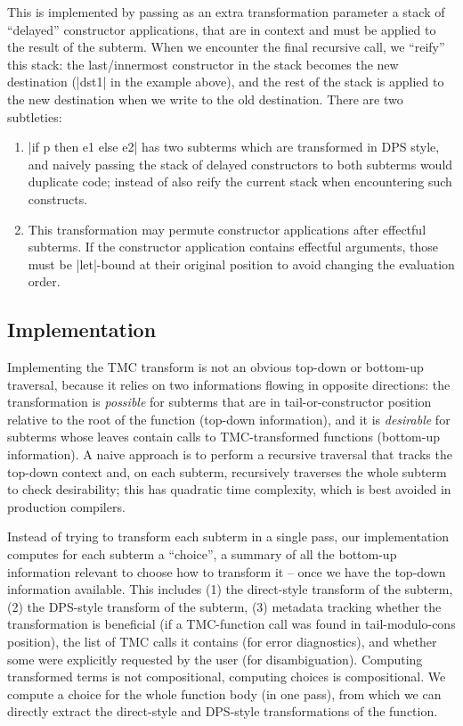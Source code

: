 This is implemented by passing as an extra transformation parameter a stack of ``delayed'' constructor applications, that are in context and must be applied to the result of the subterm. When we encounter the final recursive call, we ``reify'' this stack: the last/innermost constructor in the stack becomes the new destination (\ocaml|dst1| in the example above), and the rest of the stack is applied to the new destination when we write to the old destination. There are two subtleties:
\begin{enumerate}
\item \ocaml|if p then e1 else e2| has two subterms which are transformed in DPS style, and naively passing the stack of delayed constructors to both subterms would duplicate code; instead of also reify the current stack when encountering such constructs.
\item This transformation may permute constructor applications after effectful subterms. If the constructor application contains effectful arguments, those must be \ocaml|let|-bound at their original position to avoid changing the evaluation order.
\end{enumerate}

\subsection{Implementation} \label{subsec:implementation} Implementing the TMC transform is not an obvious top-down or bottom-up traversal, because it relies on two informations flowing in opposite directions: the transformation is \emph{possible} for subterms that are in tail-or-constructor position relative to the root of the function (top-down information), and it is \emph{desirable} for subterms whose leaves contain calls to TMC-transformed functions (bottom-up information). A naive approach is to perform a recursive traversal that tracks the top-down context and, on each subterm, recursively traverses the whole subterm to check desirability; this has quadratic time complexity, which is best avoided in production compilers.

Instead of trying to transform each subterm in a single pass, our implementation computes for each subterm a ``choice'', a summary of all the bottom-up information relevant to choose how to transform it -- once we have the top-down information available. This includes (1) the direct-style transform of the subterm, (2) the DPS-style transform of the subterm, (3) metadata tracking whether the transformation is beneficial (if a TMC-function call was found in tail-modulo-cons position), the list of TMC calls it contains (for error diagnostics), and whether some were explicitly requested by the user (for disambiguation). Computing transformed terms is not compositional, computing choices is compositional. We compute a choice for the whole function body (in one pass), from which we can directly extract the direct-style and DPS-style transformations of the function.


